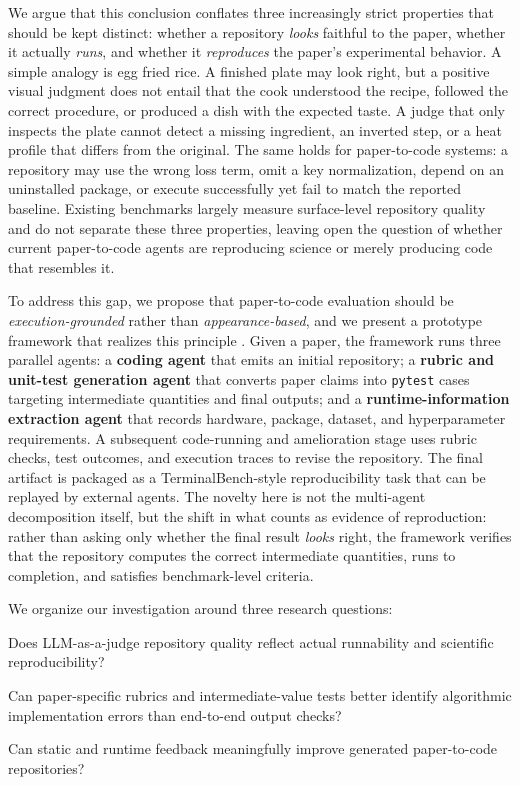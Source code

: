 \documentclass[11pt]{article}
\begin{document}
We argue that this conclusion conflates three increasingly strict
properties that should be kept distinct: whether a repository
\emph{looks} faithful to the paper, whether it actually \emph{runs},
and whether it \emph{reproduces} the paper's experimental behavior. A
simple analogy is egg fried rice. A finished plate may look right,
but a positive visual judgment does not entail that the cook
understood the recipe, followed the correct procedure, or produced a
dish with the expected taste. A judge that only inspects the plate
cannot detect a missing ingredient, an inverted step, or a heat
profile that differs from the original. The same holds for
paper-to-code systems: a repository may use the wrong loss term, omit
a key normalization, depend on an uninstalled package, or execute
successfully yet fail to match the reported baseline. Existing
benchmarks largely measure surface-level repository quality and do
not separate these three properties, leaving open the question of
whether current paper-to-code agents are reproducing science or
merely producing code that resembles it.

To address this gap, we propose that paper-to-code evaluation should
be \emph{execution-grounded} rather than \emph{appearance-based}, and
we present a prototype framework that realizes this principle .
Given a paper, the framework runs three parallel agents: a
\textbf{coding agent} that emits an initial repository; a
\textbf{rubric and unit-test generation agent} that converts paper
claims into \texttt{pytest} cases targeting intermediate quantities
and final outputs; and a \textbf{runtime-information extraction
agent} that records hardware, package, dataset, and hyperparameter
requirements. A subsequent code-running and amelioration stage uses
rubric checks, test outcomes, and execution traces to revise the
repository. The final artifact is packaged as a TerminalBench-style
\citep{tbench2025} reproducibility task that can be replayed by
external agents. The novelty here is not the multi-agent
decomposition itself, but the shift in what counts as evidence of
reproduction: rather than asking only whether the final result
\emph{looks} right, the framework verifies that the repository
computes the correct intermediate quantities, runs to completion,
and satisfies benchmark-level criteria.

We organize our investigation around three research questions:
\begin{description}[leftmargin=1em,itemsep=0pt,topsep=2pt]
  \item[\textbf{RQ1}] Does LLM-as-a-judge repository quality reflect
    actual runnability and scientific reproducibility?
  \item[\textbf{RQ2}] Can paper-specific rubrics and intermediate-value
    tests better identify algorithmic implementation errors than
    end-to-end output checks?
  \item[\textbf{RQ3}] Can static and runtime feedback meaningfully
    improve generated paper-to-code repositories?
\end{description}
\end{document}

